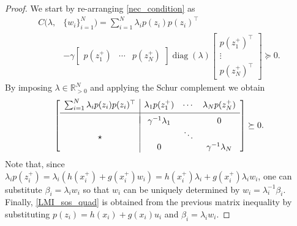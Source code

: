 \documentclass[10pt,a4paper]{amsart}
\DeclareMathOperator{\diag}{diag}
\begin{document}
\begin{proof}
	We start by re-arranging \eqref{nec_condition} as
	\begin{equation*}
		\begin{aligned}
			C(\lambda,&\{w_i\}_{i=1}^{N}) = \sum_{i=1}^{N} \lambda_i p(z_i)p(z_i)^\top \\
			& - \gamma \begin{bmatrix} p(z_1^+) & \cdots & p(z_N^+) \end{bmatrix} \diag (\lambda)\begin{bmatrix} p(z^+_1)^\top \\ \vdots \\ p(z^+_N)^\top \end{bmatrix} \succeq0.
		\end{aligned}
	\end{equation*}
By imposing $\lambda\in\mathbb{R}^{N}_{>0}$ and applying the Schur complement we obtain
%
\begin{equation*}
	\left[\begin{array}{c|ccc}
		\sum_{i=1}^{N} \lambda_i p(z_i)p(z_i)^\top & \lambda_1p(z_1^+) & \cdots & \lambda_Np(z_N^+) \\[0.1cm]
		\hline\\[-0.3cm]
		& \gamma^{-1} \lambda_1 & & 0 \\
		\star & & \ddots & \\
		& 0 & & \gamma^{-1} \lambda_N
	\end{array}\right] \succeq0 .
\end{equation*} 
Note that, since $\lambda_i p(z_i^+) = \lambda_i (h(x_i^+) + g(x_i^+)w_i) = h(x_i^+)\lambda_i + g(x_i^+)\lambda_i w_i$, one can substitute $\beta_i=\lambda_i w_i$ so that $w_i$ can be uniquely determined by $w_i = \lambda_i^{-1} \beta_i$. Finally, \eqref{LMI_sos_quad} is obtained from the previous matrix inequality by substituting $p(z_i) = h(x_i) + g(x_i)u_i$ and $\beta_i = \lambda_i w_i$.
\end{proof}
\end{document}
